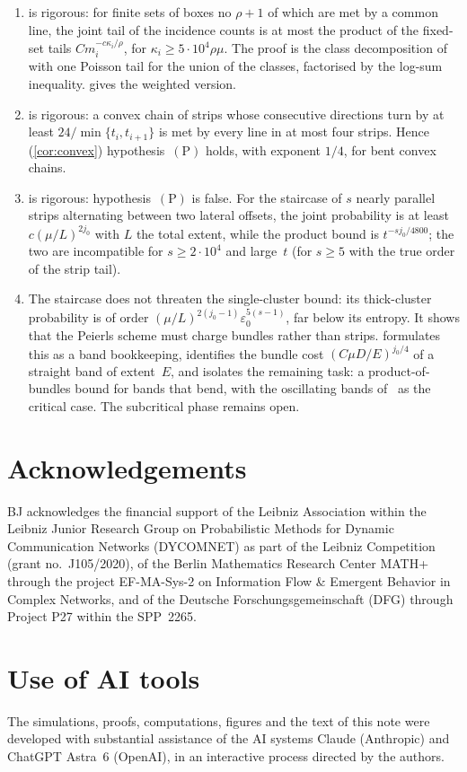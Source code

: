\documentclass[11pt,letterpaper]{article}
\begin{document}
\begin{enumerate}
  \item {} is rigorous: for finite sets of boxes no $\rho+1$ of which are met by a common line, the joint tail of the incidence counts is at most the product of the fixed-set tails $Cm_i^{-c\kappa_i/\rho}$, for $\kappa_i\ge5\cdot10^4\rho\mu$. The proof is the class decomposition of~\cite{SC26} with one Poisson tail for the union of the classes, factorised by the log-sum inequality.  gives the weighted version.
  \item {} is rigorous: a convex chain of strips whose consecutive directions turn by at least $24/\min\{t_i,t_{i+1}\}$ is met by every line in at most four strips. Hence (\cref{cor:convex}) hypothesis~$\mathrm{(P)}$ holds, with exponent $1/4$, for bent convex chains.
  \item {} is rigorous: hypothesis~$\mathrm{(P)}$ is false. For the staircase of $s$ nearly parallel strips alternating between two lateral offsets, the joint probability is at least $c(\mu/L)^{2j_0}$ with $L$ the total extent, while the product bound is $t^{-sj_0/4800}$; the two are incompatible for $s\ge2\cdot10^4$ and large~$t$ (for $s\ge5$ with the true order of the strip tail).
  \item The staircase does not threaten the single-cluster bound: its thick-cluster probability is of order $(\mu/L)^{2(j_0-1)}\varepsilon_0^{5(s-1)}$, far below its entropy. It shows that the Peierls scheme must charge bundles rather than strips.  formulates this as a band bookkeeping, identifies the bundle cost $(C\mu D/E)^{j_0/4}$ of a straight band of extent~$E$, and isolates the remaining task: a product-of-bundles bound for bands that bend, with the oscillating bands of~\cite{OSC26} as the critical case. The subcritical phase remains open.
\end{enumerate}

\section*{Acknowledgements}

BJ acknowledges the financial support of the Leibniz Association within the Leibniz Junior Research Group on Probabilistic Methods for Dynamic Communication Networks (DYCOMNET) as part of the Leibniz Competition (grant no.~J105/2020), of the Berlin Mathematics Research Center MATH+ through the project EF-MA-Sys-2 on Information Flow \& Emergent Behavior in Complex Networks, and of the Deutsche Forschungsgemeinschaft (DFG) through Project P27 within the SPP~2265.

\section*{Use of AI tools}

The simulations, proofs, computations, figures and the text of this note were developed with substantial assistance of the AI systems Claude (Anthropic) and ChatGPT Astra~6 (OpenAI), in an interactive process directed by the authors.



\end{document}
